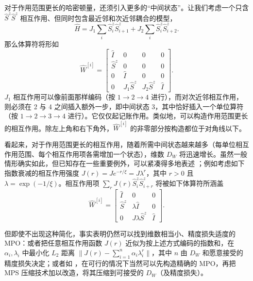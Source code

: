对于作用范围更长的哈密顿量，还须引入更多的``中间状态''。让我们考虑一个只含 $\hat{S}^z \hat{S}^z$ 相互作用、但同时包含最近邻和次近邻耦合的模型，
\begin{equation}
\hat{H} = J_1 \sum_{i} \hat{S}^z_i \hat{S}^z_{i+1} + J_2 \sum_{i} \hat{S}^z_i \hat{S}^z_{i+2} .
\end{equation}
那么体算符将形如
\begin{equation}
\hat{W}^{[i]} = \left[
\begin{array}{cccc}
\hat{I} & 0 & 0 & 0 \\
\hat{S}^z & 0 & 0 & 0 \\
0 & \hat{I} & 0 & 0 \\
0 & J_1\hat{S}^z & J_2\hat{S}^z & \hat{I}
\end{array}
\right] .
\end{equation}
$J_1$ 相互作用可以像前面那样编码（按 $1 \rightarrow 2 \rightarrow 4$ 进行），而对次近邻相互作用，则必须在 2 与 4 之间插入额外一步，即中间状态 3，其中恰好插入一个单位算符（按 $1 \rightarrow 2 \rightarrow 3 \rightarrow 4$ 进行）。它仅仅起记账作用。类似地，可以构造作用范围更长的相互作用。除左上角和右下角外，$\hat{W}^{[i]}$ 的非零部分按构造都位于对角线以下。

看起来，对于作用范围更长的相互作用，随着所需中间状态越来越多（每单位相互作用范围、每个相互作用项各需增加一个状态），维数 $D_W$ 将迅速增长。虽然一般情形确实如此，但已知存在一些重要例外，可以紧凑得多地表述 \cite{Frowis10,Crosswhite08a}；例如考虑如下指数衰减的相互作用强度 $J(r)=J e^{-r/\xi} = J \lambda^r$，其中 $r>0$ 且 $\lambda = \exp(-1/\xi)$。相互作用项 $\sum_r J(r)\hat{S}^z_i \hat{S}^z_{i+r}$ 将被如下体算符所涵盖
\begin{equation}
\hat{W}^{[i]} = \left[
\begin{array}{ccc}
\hat{I} & 0 & 0  \\
\hat{S}^z & \lambda\hat{I} & 0  \\
0 & J\lambda \hat{S}^z & \hat{I}
\end{array}
\right] .
\end{equation}

但即使不出现这种简化，事实表明仍然可以找到维数相当小、精度损失适度的 MPO：或者把任意相互作用函数 $J(r)$ 近似为按上述方式编码的指数和\cite{VerstraetePirvu08,Crosswhite08a}，在 $\alpha_i, \lambda_i$ 中最小化 $L_2$ 距离 $\| J(r) - \sum_{i=1}^n \alpha_i \lambda_i^r \|$，其中 $n$ 由 $D_W$ 和愿意接受的精度损失决定；或者如 \cite{Frowis10}，在可行的情况下当然可以先构造精确的 MPO，再把 MPS 压缩技术加以改造，将其压缩到可接受的 $D_W$（及精度损失）。 

